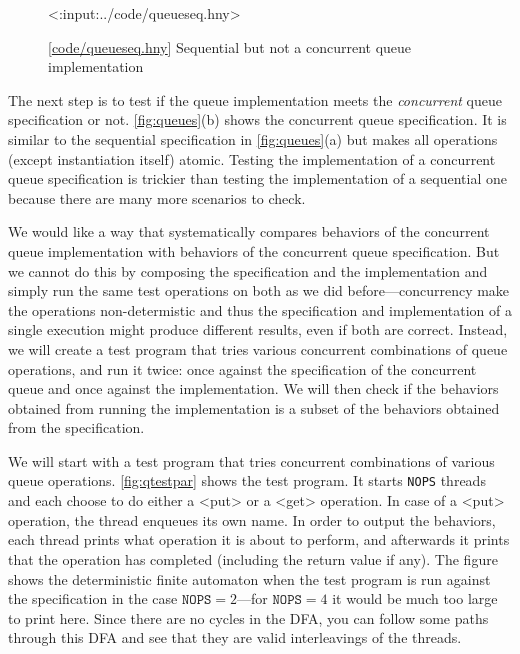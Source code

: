\documentclass{report}
\newcommand{\harmonylink}[1]{%
[\href{https://harmony.cs.cornell.edu/#1}{\underline{#1}}]%
}
\newenvironment{code}{
\tcolorbox
}{
\endtcolorbox
}
\begin{document}
\begin{figure}
\begin{code}
<{:input:../code/queueseq.hny}>
\end{code}
\caption{\harmonylink{code/queueseq.hny} Sequential but not a concurrent
queue implementation}
\label{fig:queueseq}
\end{figure}

The next step is to test if the queue implementation
meets the \emph{concurrent} queue specification or not.
\autoref{fig:queues}(b) shows the concurrent queue specification.
It is similar to the sequential specification in \autoref{fig:queues}(a)
but makes all operations (except instantiation itself) atomic.
Testing the implementation of a concurrent queue specification is
trickier than testing the implementation of a sequential one because
there are many more scenarios to check.

We would like a way that systematically compares behaviors of the
concurrent queue implementation with behaviors of the concurrent
queue specification.  But we cannot do this by composing the specification
and the implementation and simply run the same test operations on both as we
did before---concurrency make the operations non-determistic and thus
the specification and implementation of a single execution might produce
different results, even if both are correct.
Instead, we will create a test program that tries various concurrent
combinations of queue operations, and run it twice: once against the
specification of the concurrent queue and once against the
implementation.  We will then check if the behaviors obtained from
running the implementation is a subset of the behaviors obtained
from the specification.

We will start with a test program that tries concurrent combinations
of various queue operations.
\autoref{fig:qtestpar} shows the test program.  It starts
\texttt{NOPS} threads and each choose to do either a <{put}>
or a <{get}> operation.  In case of a <{put}> operation,
the thread enqueues its own name.  In order to output the behaviors,
each thread prints what operation it is about to perform,
and afterwards it prints that the operation has
completed (including the return value if any).
The figure shows the deterministic finite automaton when the test
program is run against the specification in the case
$\texttt{NOPS} = 2$---for $\texttt{NOPS} = 4$ it would be much
too large to print here.  Since there are no cycles in the DFA, you
can follow some paths through this DFA and see that they are valid
interleavings of the threads.
\end{document}
